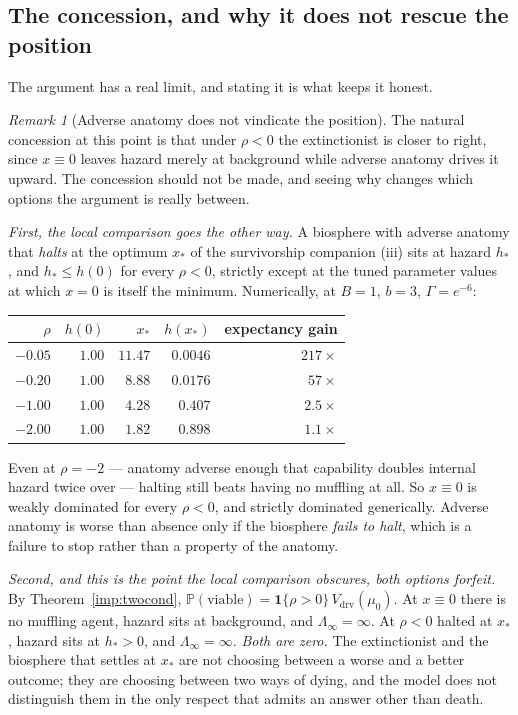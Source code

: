 \documentclass[11pt]{article}
\newcommand{\PP}{\mathbb{P}}
\newcommand{\one}{\mathbf{1}}
\theoremstyle{plain}
\theoremstyle{definition}
\theoremstyle{remark}
\newtheorem{remark}[theorem]{Remark}
\begin{document}
\subsection{The concession, and why it does not rescue the position}
\label{hr:subsub:concession}

The argument has a real limit, and stating it is what keeps it honest.

\begin{remark}[Adverse anatomy does not vindicate the position]
\label{hr:rem:concession}
The natural concession at this point is that under $\rho<0$ the
extinctionist is closer to right, since $x\equiv0$ leaves hazard merely
at background while adverse anatomy drives it upward. The concession
should not be made, and seeing why changes which options the argument is
really between.

\emph{First, the local comparison goes the other way.} A biosphere with
adverse anatomy that \emph{halts} at the optimum $x_\ast$ of
the survivorship companion \cite{SurvA}(iii) sits at hazard $h_\ast$, and
$h_\ast\le h(0)$ for every $\rho<0$, strictly except at the tuned
parameter values at which $x=0$ is itself the minimum. Numerically, at
$B=1$, $b=3$, $\Gamma=e^{-6}$:
\begin{center}\small
\begin{tabular}{@{}rrrrr@{}}
\toprule
$\rho$ & $h(0)$ & $x_\ast$ & $h(x_\ast)$ & expectancy gain\\
\midrule
$-0.05$ & $1.00$ & $11.47$ & $0.0046$ & $217\times$\\
$-0.20$ & $1.00$ & $8.88$ & $0.0176$ & $57\times$\\
$-1.00$ & $1.00$ & $4.28$ & $0.407$ & $2.5\times$\\
$-2.00$ & $1.00$ & $1.82$ & $0.898$ & $1.1\times$\\
\bottomrule
\end{tabular}
\end{center}
Even at $\rho=-2$ --- anatomy adverse enough that capability doubles
internal hazard twice over --- halting still beats having no muffling at
all. So $x\equiv0$ is weakly dominated for every $\rho<0$, and strictly
dominated generically. Adverse
anatomy is worse than absence only if the biosphere \emph{fails to
halt}, which is a failure to stop rather than a property of the anatomy.

\emph{Second, and this is the point the local comparison obscures, both
options forfeit.} By Theorem~\ref{imp:twocond},
$\PP(\text{viable})=\one\{\rho>0\}\,V_{\mathrm{drv}}(\mu_0)$. At
$x\equiv0$ there is no muffling agent, hazard sits at background, and
$\Lambda_\infty=\infty$. At $\rho<0$ halted at $x_\ast$, hazard sits at
$h_\ast>0$, and $\Lambda_\infty=\infty$. \emph{Both are zero.} The
extinctionist and the biosphere that settles at $x_\ast$ are not
choosing between a worse and a better outcome; they are choosing between
two ways of dying, and the model does not distinguish them in the only
respect that admits an answer other than death.


\end{remark}
\end{document}
